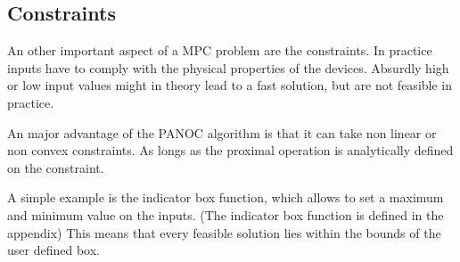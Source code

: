 		\subsection{Constraints}
			An other important aspect of a MPC problem are the constraints. In practice inputs have to comply with the physical properties of the devices. Absurdly high or low input values might in theory lead to a fast solution, but are not feasible in practice.
			
			An major advantage of the PANOC algorithm is that it can take non linear or non convex constraints. As longs as the proximal operation is analytically defined on the constraint. 
			
			A simple example is the indicator box function, which allows to set a maximum and minimum value on the inputs. (The indicator box function is defined in the appendix) This means that every feasible solution lies within the bounds of the user defined box.